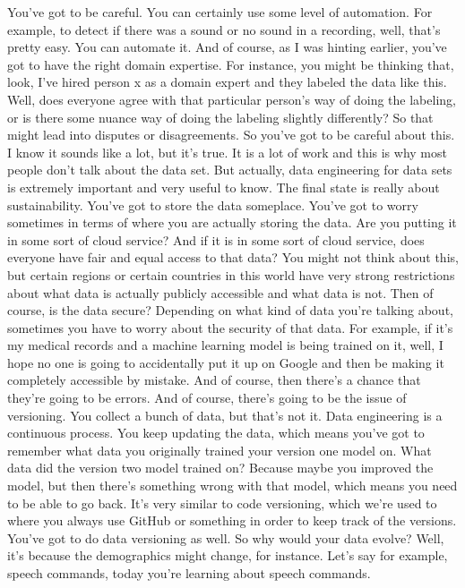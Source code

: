 You've got to be careful.
You can certainly use some level of automation.
For example, to detect if there was a sound or no sound in a recording,
well, that's pretty easy.
You can automate it.
And of course, as I was hinting earlier, you've
got to have the right domain expertise.
For instance, you might be thinking that, look, I've
hired person x as a domain expert and they labeled the data like this.
Well, does everyone agree with that particular person's
way of doing the labeling, or is there some nuance way
of doing the labeling slightly differently?
So that might lead into disputes or disagreements.
So you've got to be careful about this.
I know it sounds like a lot, but it's true.
It is a lot of work and this is why most people don't talk about the data set.
But actually, data engineering for data sets
is extremely important and very useful to know.
The final state is really about sustainability.
You've got to store the data someplace.
You've got to worry sometimes in terms of where you are actually
storing the data.
Are you putting it in some sort of cloud service?
And if it is in some sort of cloud service,
does everyone have fair and equal access to that data?
You might not think about this, but certain regions or certain countries
in this world have very strong restrictions
about what data is actually publicly accessible and what data is not.
Then of course, is the data secure?
Depending on what kind of data you're talking about,
sometimes you have to worry about the security of that data.
For example, if it's my medical records and a machine learning model
is being trained on it, well, I hope no one
is going to accidentally put it up on Google
and then be making it completely accessible by mistake.
And of course, then there's a chance that they're going to be errors.
And of course, there's going to be the issue of versioning.
You collect a bunch of data, but that's not it.
Data engineering is a continuous process.
You keep updating the data, which means you've
got to remember what data you originally trained your version one model on.
What data did the version two model trained on?
Because maybe you improved the model, but then there's
something wrong with that model, which means you need to be able to go back.
It's very similar to code versioning, which
we're used to where you always use GitHub or something in order
to keep track of the versions.
You've got to do data versioning as well.
So why would your data evolve?
Well, it's because the demographics might change, for instance.
Let's say for example, speech commands, today you're
learning about speech commands.
